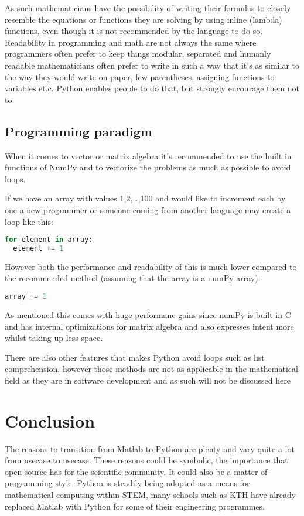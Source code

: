 \documentclass{article}
\begin{document}
As such mathematicians have the possibility of writing their formulas to closely resemble the equations or functions they are solving
by using inline (lambda) functions, even though it is not recommended by the language to do so. Readability in programming and math are
not always the same where programmers often prefer to keep things modular, separated and humanly readable mathematicians often prefer
to write in such a way that it's as similar to the way they would write on paper, few parentheses, assigning functions to variables et.c.
Python enables people to do that, but strongly encourage them not to.

\subsection{Programming paradigm}
When it comes to vector or matrix algebra it's recommended to use the built in functions of NumPy and to vectorize the problems
as much as possible to avoid loops.

If we have an array with values 1,2,\ldots,100 and would like to increment each by one a new programmer or someone coming from another
language may create a loop like this:
\begin{lstlisting}[language=Python]
for element in array:
  element += 1
\end{lstlisting}
However both the performance and readability of this is much lower compared to the recommended method (assuming that the array is a
numPy array):
\begin{lstlisting}[language=Python]
array += 1
\end{lstlisting}

As mentioned this comes with huge performane gains since numPy is built in C and has internal optimizations for matrix algebra and also
expresses intent more whilst taking up less space.

There are also other features that makes Python avoid loops such as list comprehension, however those methods are not as applicable
in the mathematical field as they are in software development and as such will not be discussed here




\section{Conclusion}%
The reasons to transition from Matlab to Python are plenty and vary quite a lot from usecase to usecase. 
These reasons could be symbolic, the importance that open-source has for the scientific community.
It could also be a matter of programming style. Python is steadily being adopted as a means for mathematical computing within STEM, 
many schools such as KTH have already replaced Matlab with Python for some of their engineering programmes.
\newline
\end{document}
